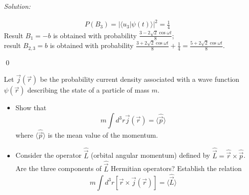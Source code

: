 \documentclass[12pt,a4paper]{article}
\newenvironment{problem}[2][Problem]{\begin{trivlist}
\item[\hskip \labelsep {\bfseries #1}\hskip \labelsep {\bfseries #2.}]}{\end{trivlist}}
\newenvironment{sol}
    {\emph{Solution:}
    }
    {
    \qed
    }
\begin{document}
\begin{sol}
\begin{itemize}
\begin{gather}
P(B_3)=\left|\langle u_3|\psi(t)\rangle\right|^2=\frac{1}{4}
\end{gather}
Result $B_1=-b$ is obtained with probability $\frac{3-2\sqrt{2}\cos\omega t}{8}$;\\
result $B_{2,3}=b$ is obtained with probability $\frac{3+2\sqrt{2}\cos\omega t}{8}+\frac{1}{4}=\frac{5+2\sqrt{2}\cos\omega t}{8}$.
\end{itemize}
\end{sol}

\begin{problem}{5}
[C-T Exercise 3-8] Let $\vec{j}(\vec{r})$ be the probability current density associated with a wave function $\psi(\vec{r})$ describing the state of a particle of mass $m$.
\begin{itemize}
\item[(a)] Show that
\[
m\int d^3r\vec{j}(\vec{r})=\langle\hat{\vec{p}}\rangle
\]
where $\langle\hat{\vec{p}}\rangle$ is the mean value of the momentum.
\item[(b)] Consider the operator $\hat{\vec{L}}$ (orbital angular momentum) defined by $\hat{\vec{L}}=\hat{\vec{r}}\times\hat{\vec{p}}$. Are the three components of $\hat{\vec{L}}$ Hermitian operators? Establish the relation
\[
m\int d^3r[\vec{r}\times\vec{j}(\vec{r})]=\langle\hat{\vec{L}}\rangle
\]
\end{itemize}
\end{problem}
\end{document}
